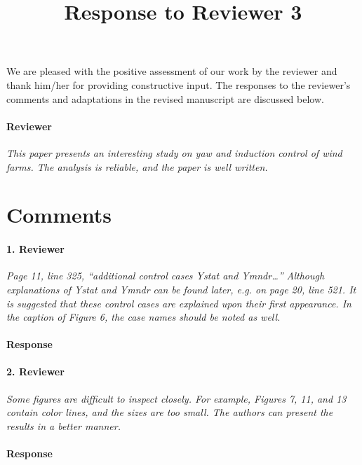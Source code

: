 \documentclass[]{article}
\title{Response to Reviewer 3}
\author{}
\date{}
\begin{document}
\maketitle

We are pleased with the positive assessment of our work by the reviewer and thank him/her for providing constructive input. The responses to the reviewer's comments and adaptations in the revised manuscript are discussed below.

\hrulefill

\paragraph{Reviewer} \textit{This paper presents an interesting study on yaw and induction control of wind farms. The analysis is reliable, and the paper is well written.}


\section*{Comments}
\hrulefill

\paragraph{1. Reviewer} \textit{Page 11, line 325, “additional control cases Ystat and Ymndr…” Although explanations of Ystat and Ymndr can be found later, e.g. on page 20, line 521. It is suggested that these control cases are explained upon their first appearance. In the caption of Figure 6, the case names should be noted as well.}

\paragraph{Response} 

\hrulefill

\paragraph{2. Reviewer} \textit{Some figures are difficult to inspect closely. For example, Figures 7, 11, and 13 contain color lines, and the sizes are too small. The authors can present the results in a better manner.}

\paragraph{Response} 

\hrulefill
\end{document}

